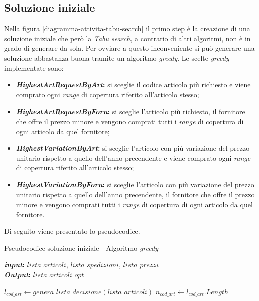 \subsection{Soluzione iniziale}
\label{sec:soluzione-iniziale}
\noindent Nella figura \ref{diagramma-attivita-tabu-search} il primo step è la creazione di una soluzione iniziale che
però la \textit{Tabu search}, a contrario di altri algoritmi, non è in grado di generare da sola. Per ovviare a questo inconveniente
si può generare una soluzione abbastanza buona tramite un algoritmo \textit{greedy}.
Le scelte \textit{greedy} implementate sono:
\begin{itemize}
    \item \textbf{\textit{HighestArtRequestByArt}:} si sceglie
    il codice articolo più richiesto e viene comprato ogni
    \textit{range} di copertura riferito all'articolo stesso;
    \item \textbf{\textit{HighestArtRequestByForn}:} si sceglie
    l'articolo più richiesto, il fornitore che
    offre il prezzo minore e vengono comprati tutti i \textit{range}
    di copertura di ogni articolo
    da quel fornitore;
    \item \textbf{\textit{HighestVariationByArt}:} si sceglie
    l'articolo con più variazione del prezzo unitario rispetto a quello dell'anno
    precendente e viene comprato ogni
    \textit{range} di copertura riferito all'articolo stesso;
    \item \textbf{\textit{HighestVariationByForn}:} si sceglie
    l'articolo con più variazione del prezzo unitario rispetto a quello dell'anno
    precendente, il fornitore che
    offre il prezzo minore e vengono comprati tutti i \textit{range}
    di copertura di ogni articolo
    da quel fornitore.
\end{itemize}
Di seguito viene presentato lo pseudocodice.
\vspace*{\fill}
\begin{algorithm}
    \captionsetup{labelformat=empty}
    \caption{Pseudocodice soluzione iniziale - Algoritmo \textit{greedy}}
    \vspace{0.1cm}
    \hspace*{\algorithmicindent} \textbf{\textit{input}:} {$lista\_articoli$}, {$lista\_spedizioni$}, {$lista\_prezzi$}\\
    \hspace*{\algorithmicindent} \textbf{\textit{Output}:} {$lista\_articoli\_opt$}
    \begin{algorithmic}[1]
        \State $l_{cod\_art} \gets genera\_lista\_decisione(lista\_articoli)$
        \State $n_{cod\_art} \gets l_{cod\_art}.Length$
    \end{algorithmic}
\end{algorithm}
